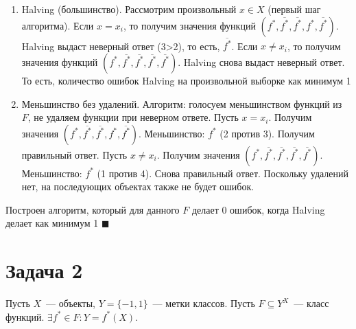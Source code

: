 \documentclass[a4paper]{article}
\begin{document}
\begin{enumerate}
\item Halving (большинство). Рассмотрим произвольный $x\in X$ (первый шаг алгоритма). Если $x=x_i$, то получим значения функций $(f^*, \overline{f^*}, \overline{f^*},f^*,\overline{f^*})$. Halving выдаст неверный ответ (3>2), то есть, $\overline{f^*}$. Если $x\neq x_i$, то получим значения функций $(f^*, \overline{f^*}, \overline{f^*},\overline{f^*},\overline{f^*})$. Halving снова выдаст неверный ответ. То есть, количество ошибок Halving на произвольной выборке как минимум 1
\item Меньшинство без удалений. Алгоритм: голосуем меньшинством функций из $F$, не удаляем функции при неверном ответе. Пусть $x=x_i$. Получим значения $(f^*, \overline{f^*}, \overline{f^*},f^*,\overline{f^*})$. Меньшинство: $f^*$ (2 против 3). Получим правильный ответ. Пусть $x\neq x_i$. Получим значения $(f^*, \overline{f^*}, \overline{f^*},\overline{f^*},\overline{f^*})$. Меньшинство: $f^*$ (1 против 4). Снова правильный ответ. Поскольку удалений нет, на последующих объектах также не будет ошибок.
\end{enumerate}

Построен алгоритм, который для данного $F$ делает 0 ошибок, когда Halving делает как минимум 1 $\blacksquare$
\section*{Задача 2}
Пусть $X$~--- объекты, $Y=\{-1,1\}$~--- метки классов. Пусть $F\subseteq Y^X$~--- класс функций. $\exists f^*\in F\colon Y=f^*(X)$.
\end{document}
